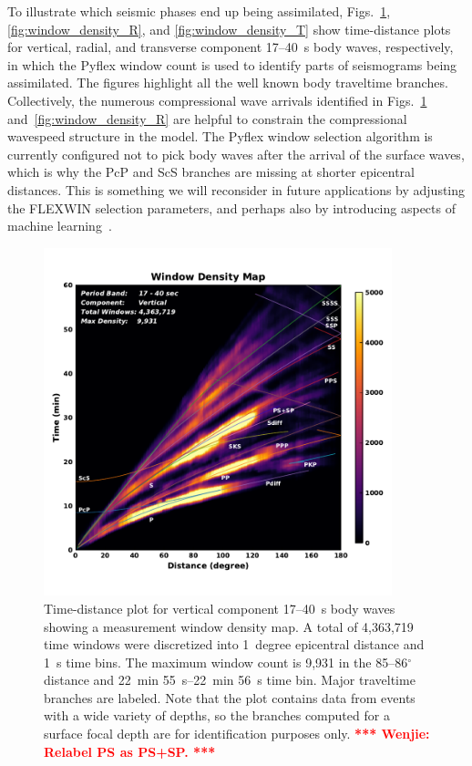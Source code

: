 \documentclass[extra,mreferee]{gji}
\newcommand{\red}[1]{\textbf{\textcolor{Red}{#1}}}
\newcommand{\towenjie}[1]{\textbf{\red{*** Wenjie: #1 ***}}}
\begin{document}
To illustrate which seismic phases end up being assimilated,
Figs.~\ref{fig:window_density_Z}, \ref{fig:window_density_R}, and \ref{fig:window_density_T} show time-distance plots
for vertical, radial, and transverse component 17--40~s body waves,
respectively,
in which the Pyflex window count is used to identify parts of seismograms being assimilated.
The figures highlight all the well known body traveltime branches.
Collectively, the numerous compressional wave arrivals identified in Figs.~\ref{fig:window_density_Z} and~\ref{fig:window_density_R} are helpful to constrain the compressional wavespeed structure in the model.
The Pyflex window selection algorithm is currently configured not to pick body waves after the arrival of the surface waves, which is why the PcP and ScS branches are missing at shorter epicentral distances.
This is something we will reconsider in future applications by adjusting the FLEXWIN selection parameters, and perhaps also by introducing aspects of machine learning~\citep{chen2017}. 

\begin{figure}
  \centering
  \includegraphics[width=0.9\textwidth]{figures/window_colorbar_linear_Z.pdf}
  \caption{\small{Time-distance plot for vertical component 17--40~s body waves showing a measurement window density map.
  A total of 4,363,719 time windows were discretized into 1~degree epicentral distance and 1~s time bins.
  The maximum window count is 9,931 in the 85--86$^\circ$ distance and 22~min 55~s--22~min 56~s time bin.
  Major traveltime branches are labeled. Note that the plot contains data from events with a wide variety of depths, so the branches computed for a surface focal depth are for identification purposes only.
  \towenjie{Relabel PS as PS+SP.}
  }}
  \label{fig:window_density_Z}
\end{figure}
\end{document}
